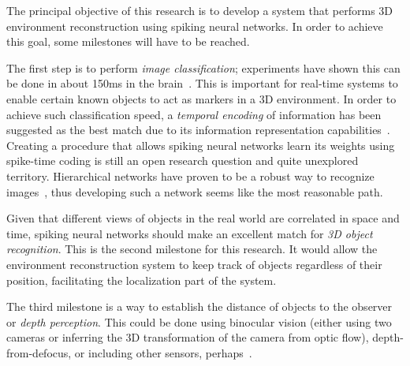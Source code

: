 The principal objective of this research is to develop a system that performs 3D environment reconstruction using spiking neural networks. In order to achieve this goal, some milestones will have to be reached. 

The first step is to perform \emph{image classification}; experiments have shown this can be done in about 150ms in the brain~\cite{Thorpe1996-speed-of-processing}. This is important for real-time systems to enable certain known objects to act as markers in a 3D environment. In order to achieve such classification speed, a \emph{temporal encoding} of information has been suggested as the best match due to its information representation capabilities~\cite{VanRullen2005-spike-times}. Creating a procedure that allows spiking neural networks learn its weights using spike-time coding is still an open research question and quite unexplored territory. Hierarchical networks have proven to be a robust way to recognize images~\cite{Behnke2003-hierachical-interpretation,Bengio2009-deep-architectures}, thus developing such a network seems like the most reasonable path. 

Given that different views of objects in the real world are correlated in space and time, spiking neural networks should make an excellent match for \emph{3D object recognition}. This is the second milestone for this research. It would allow the environment reconstruction system to keep track of objects regardless of their position, facilitating the localization part of the system.

The third milestone is a way to establish the distance of objects to the observer or \emph{depth perception}. This could be done using binocular vision (either using two cameras or inferring the 3D transformation of the camera from optic flow), depth-from-defocus, or including other sensors, perhaps~\cite{depth-from-binocular-defocus-vs,event-slam,tomasi1992shape}. 

